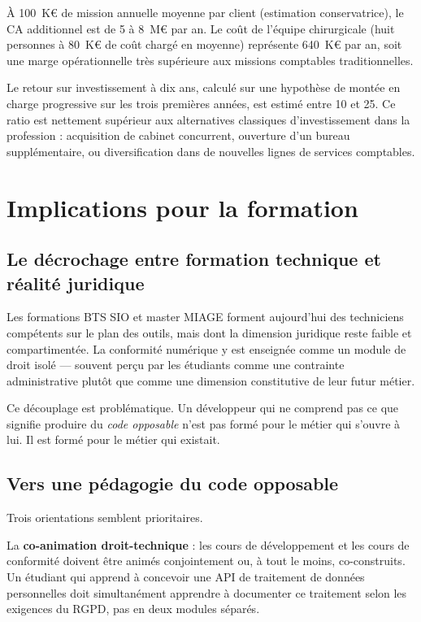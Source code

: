 \documentclass[12pt,a4paper]{article}
\begin{document}
À 100~K€ de mission annuelle moyenne par client (estimation conservatrice), le CA additionnel est de 5 à 8~M€ par an. Le coût de l'équipe chirurgicale (huit personnes à 80~K€ de coût chargé en moyenne) représente 640~K€ par an, soit une marge opérationnelle très supérieure aux missions comptables traditionnelles.

Le retour sur investissement à dix ans, calculé sur une hypothèse de montée en charge progressive sur les trois premières années, est estimé entre 10 et 25. Ce ratio est nettement supérieur aux alternatives classiques d'investissement dans la profession : acquisition de cabinet concurrent, ouverture d'un bureau supplémentaire, ou diversification dans de nouvelles lignes de services comptables.

\section{Implications pour la formation}

\subsection{Le décrochage entre formation technique et réalité juridique}

Les formations BTS SIO et master MIAGE forment aujourd'hui des techniciens compétents sur le plan des outils, mais dont la dimension juridique reste faible et compartimentée. La conformité numérique y est enseignée comme un module de droit isolé --- souvent perçu par les étudiants comme une contrainte administrative plutôt que comme une dimension constitutive de leur futur métier.

Ce découplage est problématique. Un développeur qui ne comprend pas ce que signifie produire du \emph{code opposable} n'est pas formé pour le métier qui s'ouvre à lui. Il est formé pour le métier qui existait.

\subsection{Vers une pédagogie du code opposable}

Trois orientations semblent prioritaires.

La \textbf{co-animation droit-technique} : les cours de développement et les cours de conformité doivent être animés conjointement ou, à tout le moins, co-construits. Un étudiant qui apprend à concevoir une API de traitement de données personnelles doit simultanément apprendre à documenter ce traitement selon les exigences du RGPD, pas en deux modules séparés.
\end{document}
